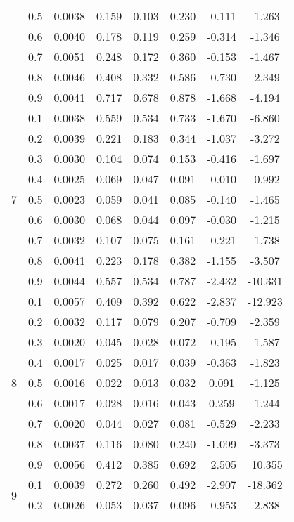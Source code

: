\documentclass[11pt,a4paper]{report}
\begin{document}
\begin{longtable}{ | c | c || c | c | c | c | c | c | }
 & 0.5 & 0.0038 & 0.159 & 0.103 & 0.230 & -0.111 & -1.263 \\
 & 0.6 & 0.0040 & 0.178 & 0.119 & 0.259 & -0.314 & -1.346 \\
 & 0.7 & 0.0051 & 0.248 & 0.172 & 0.360 & -0.153 & -1.467 \\
 & 0.8 & 0.0046 & 0.408 & 0.332 & 0.586 & -0.730 & -2.349 \\
 & 0.9 & 0.0041 & 0.717 & 0.678 & 0.878 & -1.668 & -4.194 \\
 \hline
\multirow{9}{*}{7} & 0.1 & 0.0038 & 0.559 & 0.534 & 0.733 & -1.670 & -6.860 \\
 & 0.2 & 0.0039 & 0.221 & 0.183 & 0.344 & -1.037 & -3.272 \\
 & 0.3 & 0.0030 & 0.104 & 0.074 & 0.153 & -0.416 & -1.697 \\
 & 0.4 & 0.0025 & 0.069 & 0.047 & 0.091 & -0.010 & -0.992 \\
 & 0.5 & 0.0023 & 0.059 & 0.041 & 0.085 & -0.140 & -1.465 \\
 & 0.6 & 0.0030 & 0.068 & 0.044 & 0.097 & -0.030 & -1.215 \\
 & 0.7 & 0.0032 & 0.107 & 0.075 & 0.161 & -0.221 & -1.738 \\
 & 0.8 & 0.0041 & 0.223 & 0.178 & 0.382 & -1.155 & -3.507 \\
 & 0.9 & 0.0044 & 0.557 & 0.534 & 0.787 & -2.432 & -10.331 \\
 \hline
\multirow{9}{*}{8} & 0.1 & 0.0057 & 0.409 & 0.392 & 0.622 & -2.837 & -12.923 \\
 & 0.2 & 0.0032 & 0.117 & 0.079 & 0.207 & -0.709 & -2.359 \\
 & 0.3 & 0.0020 & 0.045 & 0.028 & 0.072 & -0.195 & -1.587 \\
 & 0.4 & 0.0017 & 0.025 & 0.017 & 0.039 & -0.363 & -1.823 \\
 & 0.5 & 0.0016 & 0.022 & 0.013 & 0.032 & 0.091 & -1.125 \\
 & 0.6 & 0.0017 & 0.028 & 0.016 & 0.043 & 0.259 & -1.244 \\
 & 0.7 & 0.0020 & 0.044 & 0.027 & 0.081 & -0.529 & -2.233 \\
 & 0.8 & 0.0037 & 0.116 & 0.080 & 0.240 & -1.099 & -3.373 \\
 & 0.9 & 0.0056 & 0.412 & 0.385 & 0.692 & -2.505 & -10.355 \\
 \hline
\multirow{9}{*}{9} & 0.1 & 0.0039 & 0.272 & 0.260 & 0.492 & -2.907 & -18.362 \\
 & 0.2 & 0.0026 & 0.053 & 0.037 & 0.096 & -0.953 & -2.838 \\

\end{longtable}
\end{document}
